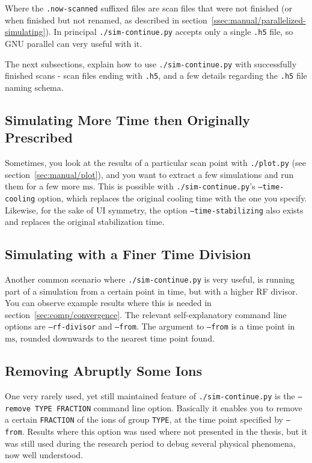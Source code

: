 Where the \texttt{.now-scanned} suffixed files are scan files that were not finished (or when finished but not renamed, as described in section~\ref{ssec:manual/parallelized-simulating}). In principal \texttt{./sim-continue.py} accepts only a single \texttt{.h5} file, so GNU parallel\cite{GNUParallel} can very useful with it.

The next subsections, explain how to use \texttt{./sim-continue.py} with successfully finished scans - scan files ending with \texttt{.h5}, and a few details regarding the \texttt{.h5} file naming schema.

\subsection{Simulating More Time then Originally Prescribed}

Sometimes, you look at the results of a particular scan point with \texttt{./plot.py} (see section~\ref{sec:manual/plot}), and you want to extract a few simulations and run them for a few more $\mathrm{ms}$. This is possible with \texttt{./sim-continue.py}'s \texttt{--time-cooling} option, which replaces the original cooling time with the one you specify. Likewise, for the sake of UI symmetry, the option \texttt{--time-stabilizing} also exists and replaces the original stabilization time.

\subsection{Simulating with a Finer Time Division}

Another common scenario where \texttt{./sim-continue.py} is very useful, is running part of a simulation from a certain point in time, but with a higher RF divisor. You can observe example results where this is needed in section~\ref{sec:comp/convergence}. The relevant self-explanatory command line options are \texttt{--rf-divisor} and \texttt{--from}. The argument to \texttt{--from} is a time point in $\mathrm{ms}$, rounded downwards to the nearest time point found.

\subsection{Removing Abruptly Some Ions}

One very rarely used, yet still maintained feature of \texttt{./sim-continue.py} is the \texttt{--remove TYPE FRACTION} command line option. Basically it enables you to remove a certain \texttt{FRACTION} of the ions of group \texttt{TYPE}, at the time point specified by \texttt{--from}. Results where this option was used where not presented in the thesis, but it was still used during the research period to debug several physical phenomena, now well understood.

